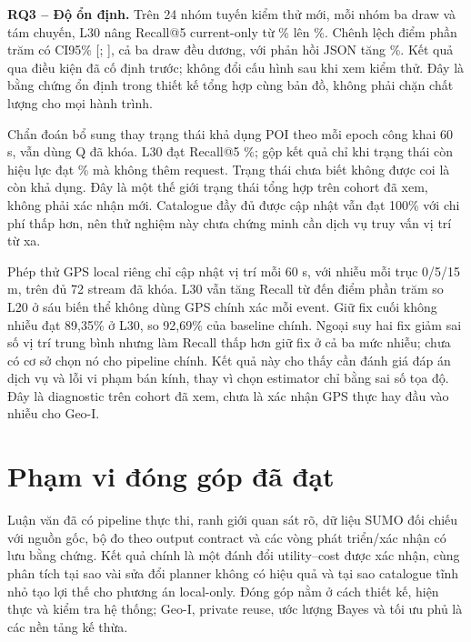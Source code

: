\textbf{RQ3 -- Độ ổn định.} Trên 24 nhóm tuyến kiểm thử mới, mỗi nhóm ba draw và tám chuyến, L30 nâng Recall@5 current-only từ \EvalFreshRecallBefore{}\% lên \EvalFreshRecallAfter{}\%. Chênh lệch \EvalFreshGain{} điểm phần trăm có CI95\% [\EvalFreshLow{}; \EvalFreshHigh{}], cả ba draw đều dương, với phản hồi JSON tăng \EvalReplyGrowth{}\%. Kết quả qua điều kiện đã cố định trước; không đổi cấu hình sau khi xem kiểm thử. Đây là bằng chứng ổn định trong thiết kế tổng hợp cùng bản đồ, không phải chặn chất lượng cho mọi hành trình.

Chẩn đoán bổ sung thay trạng thái khả dụng POI theo mỗi epoch công khai 60 s, vẫn dùng Q đã khóa. L30 đạt Recall@5 \EvalDynamicLThirtyCurrent{}\%; gộp kết quả chỉ khi trạng thái còn hiệu lực đạt \EvalDynamicLThirtyCached{}\% mà không thêm request. Trạng thái chưa biết không được coi là còn khả dụng. Đây là một thế giới trạng thái tổng hợp trên cohort đã xem, không phải xác nhận mới. Catalogue đầy đủ được cập nhật vẫn đạt 100\% với chi phí thấp hơn, nên thử nghiệm này chưa chứng minh cần dịch vụ truy vấn vị trí từ xa.

Phép thử GPS local riêng chỉ cập nhật vị trí mỗi 60 s, với nhiễu mỗi trục 0/5/15 m, trên đủ 72 stream đã khóa. L30 vẫn tăng Recall từ \SensorMinNonOracleGain{} đến \SensorMaxNonOracleGain{} điểm phần trăm so L20 ở sáu biến thể không dùng GPS chính xác mỗi event. Giữ fix cuối không nhiễu đạt 89,35\% ở L30, so 92,69\% của baseline chính. Ngoại suy hai fix giảm sai số vị trí trung bình nhưng làm Recall thấp hơn giữ fix ở cả ba mức nhiễu; chưa có cơ sở chọn nó cho pipeline chính. Kết quả này cho thấy cần đánh giá đáp án dịch vụ và lỗi vi phạm bán kính, thay vì chọn estimator chỉ bằng sai số tọa độ. Đây là diagnostic trên cohort đã xem, chưa là xác nhận GPS thực hay đầu vào nhiễu cho Geo-I.

\section{Phạm vi đóng góp đã đạt}

Luận văn đã có pipeline thực thi, ranh giới quan sát rõ, dữ liệu SUMO đối chiếu với nguồn gốc, bộ đo theo output contract và các vòng phát triển/xác nhận có lưu bằng chứng. Kết quả chính là một đánh đổi utility--cost được xác nhận, cùng phân tích tại sao vài sửa đổi planner không có hiệu quả và tại sao catalogue tĩnh nhỏ tạo lợi thế cho phương án local-only. Đóng góp nằm ở cách thiết kế, hiện thực và kiểm tra hệ thống; Geo-I, private reuse, ước lượng Bayes và tối ưu phủ là các nền tảng kế thừa.

